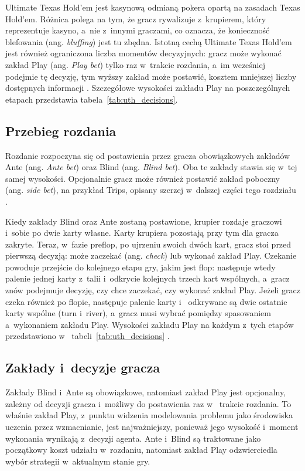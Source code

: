 Ultimate Texas Hold’em jest kasynową odmianą pokera opartą na zasadach
Texas Hold’em. Różnica polega na tym, że gracz rywalizuje z~krupierem,
który reprezentuje kasyno, a~nie z~innymi graczami, co oznacza, że
konieczność blefowania (ang. \emph{bluffing}) jest tu zbędna. Istotną
cechą Ultimate Texas Hold’em jest również ograniczona liczba momentów
decyzyjnych: gracz może wykonać zakład Play (ang. \emph{Play bet}) tylko
raz w~trakcie rozdania, a~im wcześniej podejmie tę decyzję, tym wyższy
zakład może postawić, kosztem mniejszej liczby dostępnych informacji
\cite{wizard_uth,tulalip_uth_rules,nevada_uth_rules}. Szczegółowe wysokości zakładu Play na
poszczególnych etapach przedstawia tabela~\ref{tab:uth_decisions}.

\subsection{Przebieg rozdania}

Rozdanie rozpoczyna się od postawienia przez gracza obowiązkowych zakładów
Ante (ang. \emph{Ante bet}) oraz Blind (ang. \emph{Blind bet}). Oba te
zakłady stawia się w~tej samej wysokości. Opcjonalnie gracz może również
postawić zakład poboczny (ang. \emph{side bet}), na przykład Trips, opisany
szerzej w~dalszej części tego rozdziału \cite{tulalip_uth_rules}.

Kiedy zakłady Blind oraz Ante zostaną postawione, krupier rozdaje graczowi
i~sobie po dwie karty własne. Karty krupiera pozostają przy tym dla gracza zakryte.
Teraz, w~fazie preflop, po ujrzeniu swoich dwóch kart, gracz stoi przed
pierwszą decyzją: może zaczekać (ang. \emph{check}) lub wykonać zakład
Play. Czekanie powoduje przejście do kolejnego etapu gry, jakim jest flop:
następuje wtedy palenie jednej karty z~talii i~odkrycie kolejnych trzech kart
wspólnych, a~gracz znów podejmuje decyzję, czy chce zaczekać, czy wykonać
zakład Play. Jeżeli gracz czeka również po flopie, następuje palenie karty i~
odkrywane są dwie ostatnie karty wspólne (turn i~river), a~gracz musi
wybrać pomiędzy spasowaniem a~wykonaniem zakładu Play. Wysokości zakładu
Play na każdym z~tych etapów przedstawiono w~
tabeli~\ref{tab:uth_decisions} \cite{wizard_uth,tulalip_uth_rules}.

\subsection{Zakłady i~decyzje gracza}

Zakłady Blind i~Ante są obowiązkowe, natomiast zakład Play jest
opcjonalny, zależny od decyzji gracza i~możliwy do postawienia raz w~
trakcie rozdania. To właśnie zakład Play, z~punktu widzenia modelowania
problemu jako środowiska uczenia przez wzmacnianie, jest najważniejszy,
ponieważ jego wysokość i~moment wykonania wynikają z~decyzji agenta. Ante
i~Blind są traktowane jako początkowy koszt udziału w~rozdaniu, natomiast
zakład Play odzwierciedla wybór strategii w~aktualnym stanie gry.

